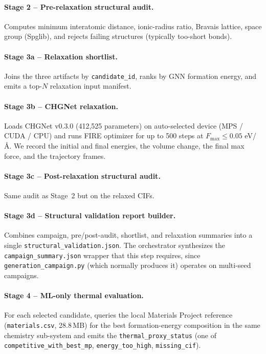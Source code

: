 \documentclass[11pt,a4paper]{report}
\begin{document}
\paragraph{Stage 2 -- Pre-relaxation structural audit.}
Computes minimum interatomic distance, ionic-radius ratio, Bravais lattice, space group
(Spglib), and rejects failing structures (typically too-short bonds).

\paragraph{Stage 3a -- Relaxation shortlist.}
Joins the three artifacts by \texttt{candidate\_id}, ranks by GNN formation energy, and
emits a top-$N$ relaxation input manifest.

\paragraph{Stage 3b -- CHGNet relaxation.}
Loads CHGNet v0.3.0 (412{,}525 parameters) on auto-selected device (MPS / CUDA / CPU) and
runs FIRE optimizer for up to 500 steps at $F_{\max}\leq0.05$ eV/\AA. We record the initial
and final energies, the volume change, the final max force, and the trajectory frames.

\paragraph{Stage 3c -- Post-relaxation structural audit.}
Same audit as Stage~2 but on the relaxed CIFs.

\paragraph{Stage 3d -- Structural validation report builder.}
Combines campaign, pre/post-audit, shortlist, and relaxation summaries into a single
\texttt{structural\_validation.json}. The orchestrator synthesizes the
\texttt{campaign\_summary.json} wrapper that this step requires, since
\texttt{generation\_campaign.py} (which normally produces it) operates on multi-seed
campaigns.

\paragraph{Stage 4 -- ML-only thermal evaluation.}
For each selected candidate, queries the local Materials Project reference
(\texttt{materials.csv}, 28.8\,MB) for the best formation-energy composition in the same
chemistry sub-system and emits the \texttt{thermal\_proxy\_status} (one of
\texttt{competitive\_with\_best\_mp}, \texttt{energy\_too\_high}, \texttt{missing\_cif}).
\end{document}
